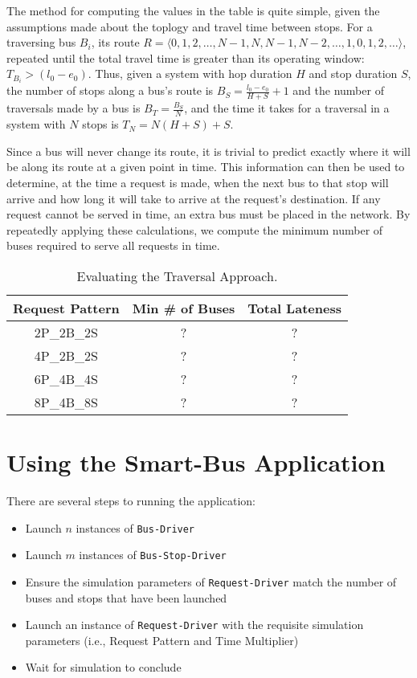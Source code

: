 \documentclass[runningheads]{llncs}
\begin{document}
The method for computing the values in the table is quite simple, given the assumptions made about the toplogy and travel time between stops. For a traversing bus $B_i$, its route $R = \langle 0, 1, 2, \dots, N-1, N, N-1, N-2, \dots, 1, 0, 1, 2, \dots \rangle$, repeated until the total travel time is greater than its operating window: $T_{B_i} > (l_0 - e_0)$. Thus, given a system with hop duration $H$ and stop duration $S$, the number of stops along a bus's route is $B_S = \frac{l_0 - e_0}{H + S} + 1$ and the number of traversals made by a bus is $B_T = \frac{B_S}{N}$, and the time it takes for a traversal in a system with $N$ stops is $T_N = N (H + S) + S$.

Since a bus will never change its route, it is trivial to predict exactly where it will be along its route at a given point in time. This information can then be used to determine, at the time a request is made, when the next bus to that stop will arrive and how long it will take to arrive at the request's destination. If any request cannot be served in time, an extra bus must be placed in the network. By repeatedly applying these calculations, we compute the minimum number of buses required to serve all requests in time.

\setlength{\tabcolsep}{1em}
\begin{table}[htbp]
\centering
\caption{Evaluating the Traversal Approach.}
\begin{tabular}{c c c}
Request Pattern & Min \# of Buses & Total Lateness \\ \hline
2P\_2B\_2S & ? & ?\\
4P\_2B\_2S & ? & ?\\
6P\_4B\_4S & ? & ?\\
8P\_4B\_8S & ? & ?\\
\hline
\end{tabular}
\label{tbl:traversal}
\end{table}

\section{Using the Smart-Bus Application}
There are several steps to running the application:
\begin{itemize}
	\item Launch $n$ instances of \lstinline{Bus-Driver}
	\item Launch $m$ instances of \lstinline{Bus-Stop-Driver}
	\item Ensure the simulation parameters of \lstinline{Request-Driver} match the number of buses and stops that have been launched
	\item Launch an instance of \lstinline{Request-Driver} with the requisite simulation parameters (i.e., Request Pattern and Time Multiplier)
	\item Wait for simulation to conclude
\end{itemize} 
\end{document}
